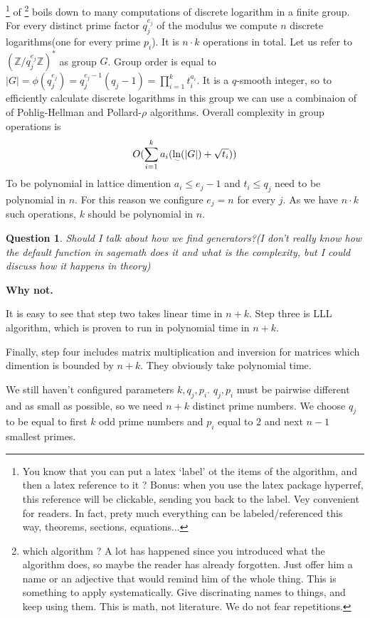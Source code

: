 \documentclass[12pt]{article}
\newcommand{\ZZ}{\mathbb{Z}}
\newtheorem{question}{Question}
\def\added{\bgroup \markoverwith{\textcolor{green!50!blue}{\lower4.5pt\hbox{\sixly \char58}}}\ULon}
\def\toimprove{\bgroup \markoverwith{\textcolor{red}{\lower4.5pt\hbox{\sixly \char58}}}\ULon}
\begin{document}
\toimprove{Step one}\footnote{You know that you can put a latex `label' ot the items of the algorithm, and then a latex reference to it ? Bonus: when you use the latex package hyperref, this reference will be clickable, sending you back to the label. Vey convenient for readers. In fact, prety much everything can be labeled/referenced this way, theorems, sections, equations...} of \toimprove{the algorithm}\footnote{which algorithm ? A lot has happened since you introduced what the algorithm does, so maybe the reader has already forgotten. Just offer him a name or an adjective that would remind him of the whole thing. This is something to apply systematically. Give discrinating names to things, and keep using them. This is math, not literature. We do not fear repetitions. } boils down to many computations of discrete logarithm in a finite group. For every distinct prime factor $q_{j}^{e_{j}}$ of the modulus we compute $n$ discrete logarithms(one for every prime $p_{i}$). It is $n \cdot k$ operations in total. Let us refer to $(\ZZ/q_{j}^{e_{j}}\ZZ)^*$ as group $G$. Group order is equal to $|G| = \phi(q_{j}^{e_{j}}) =  q_{j}^{e_{j}-1}(q_{j}-1) = \prod_{i=1}^{k} t_{i}^{a_{i}}$.
It is a $q$-smooth integer, so to efficiently calculate discrete logarithms in this group we can use a combinaion of of Pohlig-Hellman and Pollard-$\rho$ algorithms. Overall complexity in group operations is
\begin{equation}
    O(\sum_{i=1}^{k} a_{i}(\added{\ln}(|G|) + \sqrt{t_{i}}))
\end{equation}
To be polynomial in lattice dimention $a_{i} \leq e_{j}-1$ and $t_{i} \leq q_{j}$ need to be polynomial in $n$. For this reason we configure $e_{j} = n$ for every $j$. As we have $n \cdot k$ such operations, $k$ should be polynomial in $n$.

\begin{question}
    Should I talk about how we find generators?(I don't really know how the default function in sagemath does it and what is the complexity, but I could discuss how it happens in theory)
\end{question}
{\bf Why not. }

It is easy to see that step two takes linear time in $n + k$. Step three is LLL algorithm, which is proven to run in polynomial time in $n + k$.

Finally, step four includes matrix multiplication and inversion for matrices which dimention is bounded by $n + k$. They obviously take polynomial time.

We still haven't configured parameters $k, q_{j}, p_{i}$. $q_{j}, p_{i}$ must be pairwise different and as small as possible, so we need $n+k$ distinct prime numbers. We choose $q_{j}$ to be equal to first $k$ odd prime numbers and $p_{i}$ equal to $2$ and next $n-1$ smallest primes.
\end{document}
